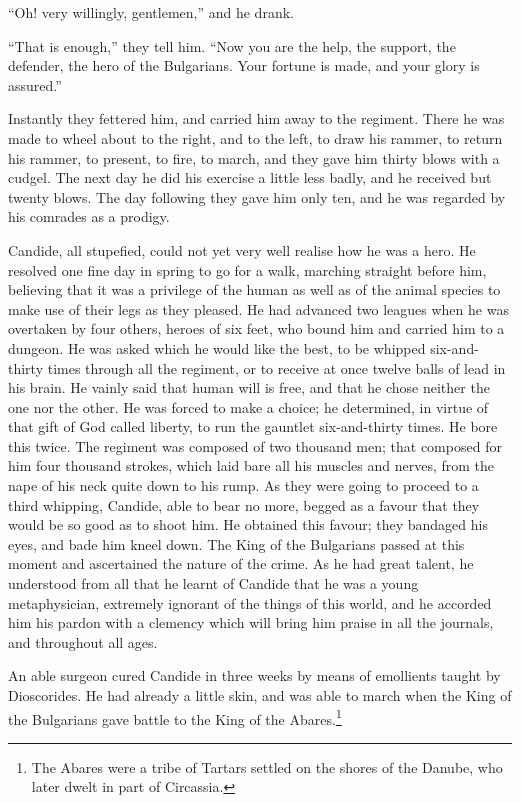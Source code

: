 ``Oh! very willingly, gentlemen,'' and he drank.

``That is enough,'' they tell him. ``Now you are the help, the support, the defender, the hero of the Bulgarians. Your fortune is made, and your glory is assured.''

Instantly they fettered him, and carried him away to the regiment. There he was made to wheel about to the right, and to the left, to draw his rammer, to return his rammer, to present, to fire, to march, and they gave him thirty blows with a cudgel. The next day he did his exercise a little less badly, and he received but twenty blows. The day following they gave him only ten, and he was regarded by his comrades as a prodigy.

Candide, all stupefied, could not yet very well realise how he was a hero. He resolved one fine day in spring to go for a walk, marching straight before him, believing that it was a privilege of the human as well as of the animal species to make use of their legs as they pleased. He had advanced two leagues when he was overtaken by four others, heroes of six feet, who bound him and carried him to a dungeon. He was asked which he would like the best, to be whipped six-and-thirty times through all the regiment, or to receive at once twelve balls of lead in his brain. He vainly said that human will is free, and that he chose neither the one nor the other. He was forced to make a choice; he determined, in virtue of that gift of God called liberty, to run the gauntlet six-and-thirty times. He bore this twice. The regiment was composed of two thousand men; that composed for him four thousand strokes, which laid bare all his muscles and nerves, from the nape of his neck quite down to his rump. As they were going to proceed to a third whipping, Candide, able to bear no more, begged as a favour that they would be so good as to shoot him. He obtained this favour; they bandaged his eyes, and bade him kneel down. The King of the Bulgarians passed at this moment and ascertained the nature of the crime. As he had great talent, he understood from all that he learnt of Candide that he was a young metaphysician, extremely ignorant of the things of this world, and he accorded him his pardon with a clemency which will bring him praise in all the journals, and throughout all ages.

An able surgeon cured Candide in three weeks by means of emollients taught by Dioscorides. He had already a little skin, and was able to march when the King of the Bulgarians gave battle to the King of the Abares.\footnote{The Abares were a tribe of Tartars settled on the shores of the Danube, who later dwelt in part of Circassia.}

